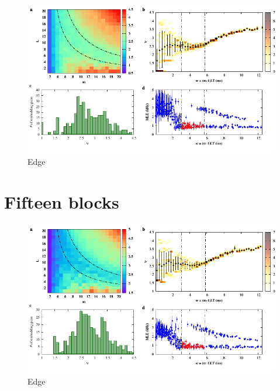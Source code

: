 \begin{figure}[H]
    \centering
    \includegraphics[width=\linewidth]{../10_blocks/2e5_points/plots/chaos_low.pdf}
    \caption{Edge}
    \label{fig:10 blocks chaos}
\end{figure}

\section{Fifteen blocks}

\begin{figure}[H]
    \centering
    \includegraphics[width=\linewidth]{../15_blocks/edge/2e5_points/plots/chaos_low.pdf}
    \caption{Edge}
    \label{fig:15 blocks chaos}
\end{figure}

